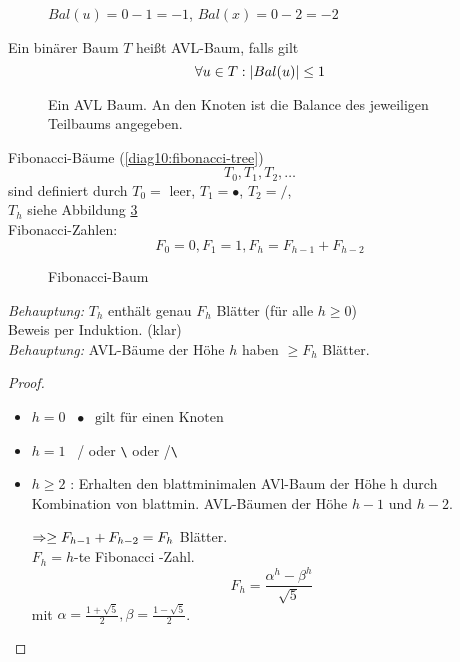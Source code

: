         
        \begin{figure}[htp]
			\centering
			
			\caption{$Bal(u) = 0 -1 = -1$, $Bal(x) = 0-2 = -2$}
			\label{diag26:balance}
        \end{figure}

        \begin{definition}
            Ein binärer Baum $T$ heißt AVL-Baum, falls gilt 
            $$
                \forall u \in T : \lvert Bal(u)\rvert \leq 1 
            $$
        \end{definition}

        \begin{figure}[htp]
            \centering
            
            \caption{Ein AVL Baum. An den Knoten ist die Balance des jeweiligen Teilbaums angegeben.}
            \label{diag9:avl-balance}
        \end{figure}

        \begin{definition}
            Fibonacci-Bäume (\autoref{diag10:fibonacci-tree})
            $$T_0, T_1, T_2, \ldots$$ sind definiert durch $T_0 = $ leer, $T_1 = \bullet$, $T_2 = /$, \\
            $T_h$ siehe Abbildung \ref{diag10:fibonacci-tree} \\
            Fibonacci-Zahlen: 
            $$F_0 = 0, F_1 = 1, F_h = F_{h-1} + F_{h-2}$$
        \end{definition}

        \begin{figure}[htp]
            \centering
            
            \caption{Fibonacci-Baum}
            \label{diag10:fibonacci-tree}
        \end{figure}
        
        \emph{Behauptung:} $T_h$ enthält genau $F_h$ Blätter (für alle $h \geq 0$) \\
        Beweis per Induktion. (klar)\\
        \emph{Behauptung:} AVL-Bäume der Höhe $h$ haben $\geq F_h$ Blätter. \\
        \begin{proof}     
            \begin{itemize}
                \item $h=0$ \ $\bullet \ \ \text{ gilt für einen Knoten}$ 
                \item $h=1$ \ / oder \verb=\= oder /\verb=\=
                \item $h \geq 2$ : Erhalten den blattminimalen AVl-Baum der Höhe h durch Kombination von blattmin. AVL-Bäumen der Höhe $h-1$ und $h-2$.

                $\Ra \geq F_{h-1} + F_{h-2} = F_h$ Blätter. \\
                $F_h = h$-te Fibonacci -Zahl. 
                $$F_h = \frac{\alpha^h - \beta^h}{\sqrt{5}}$$ mit $\alpha = \frac{1+ \sqrt{5}}{2}, \beta = \frac{1-\sqrt{5}}{2}$.   
            \end{itemize}
        \end{proof}

